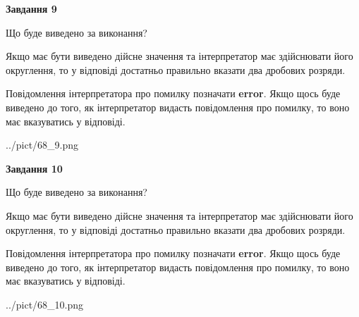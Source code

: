 \documentclass[12pt, ukrainian]{article}
\begin{document}
{\begin {Large}
{\begin {center}\textbf{Завдання 9}\end {center}}\par
Що буде виведено за виконання? \par

Якщо має бути виведено дійсне значення та інтерпретатор має здійснювати його округлення, 
то у відповіді достатньо правильно вказати два дробових розряди.

Повідомлення інтерпретатора про помилку позначати \textbf{error}.
Якщо щось буде виведено до того, як інтерпретатор видасть повідомлення про помилку, 
то воно має вказуватись у відповіді. \par

\begin{center}
	{../pict/68_9.png}
\end{center}
\newpage

{\begin {center}\textbf{Завдання 10}\end {center}}\par
Що буде виведено за виконання? \par

Якщо має бути виведено дійсне значення та інтерпретатор має здійснювати його округлення, 
то у відповіді достатньо правильно вказати два дробових розряди.

Повідомлення інтерпретатора про помилку позначати \textbf{error}.
Якщо щось буде виведено до того, як інтерпретатор видасть повідомлення про помилку, 
то воно має вказуватись у відповіді. \par

\begin{center}
	{../pict/68_10.png}
\end{center}
\newpage

\end {Large}}
\end{document}
